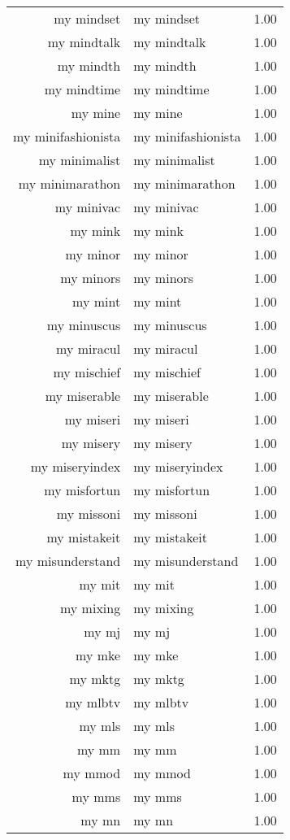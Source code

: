 \begin{table}[ht]
\begin{tabular}{rlr}
  my mindset & my mindset & 1.00 \\ 
  my mindtalk & my mindtalk & 1.00 \\ 
  my mindth & my mindth & 1.00 \\ 
  my mindtime & my mindtime & 1.00 \\ 
  my mine & my mine & 1.00 \\ 
  my minifashionista & my minifashionista & 1.00 \\ 
  my minimalist & my minimalist & 1.00 \\ 
  my minimarathon & my minimarathon & 1.00 \\ 
  my minivac & my minivac & 1.00 \\ 
  my mink & my mink & 1.00 \\ 
  my minor & my minor & 1.00 \\ 
  my minors & my minors & 1.00 \\ 
  my mint & my mint & 1.00 \\ 
  my minuscus & my minuscus & 1.00 \\ 
  my miracul & my miracul & 1.00 \\ 
  my mischief & my mischief & 1.00 \\ 
  my miserable & my miserable & 1.00 \\ 
  my miseri & my miseri & 1.00 \\ 
  my misery & my misery & 1.00 \\ 
  my miseryindex & my miseryindex & 1.00 \\ 
  my misfortun & my misfortun & 1.00 \\ 
  my missoni & my missoni & 1.00 \\ 
  my mistakeit & my mistakeit & 1.00 \\ 
  my misunderstand & my misunderstand & 1.00 \\ 
  my mit & my mit & 1.00 \\ 
  my mixing & my mixing & 1.00 \\ 
  my mj & my mj & 1.00 \\ 
  my mke & my mke & 1.00 \\ 
  my mktg & my mktg & 1.00 \\ 
  my mlbtv & my mlbtv & 1.00 \\ 
  my mls & my mls & 1.00 \\ 
  my mm & my mm & 1.00 \\ 
  my mmod & my mmod & 1.00 \\ 
  my mms & my mms & 1.00 \\ 
  my mn & my mn & 1.00 \\ 

\end{tabular}
\end{table}
